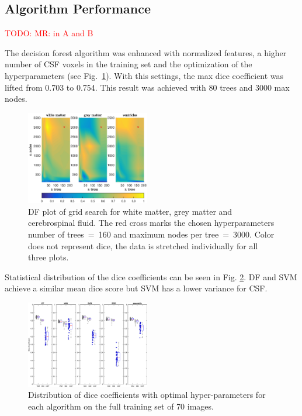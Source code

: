 \documentclass[journal]{IEEEtran}
\newcommand\TODO[1]{\textcolor{red}{TODO: #1}}
\begin{document}
\subsection{Algorithm Performance}
\TODO{MR: in A and B}



The decision forest algorithm was enhanced with normalized features, a higher number of CSF voxels in the training set and the optimization of the hyperparameters (see Fig.~\ref{f.df_white}). With this settings, the max dice coefficient was lifted from 0.703 to 0.754. This result was achieved with 80 trees and 3000 max nodes.

\begin{figure}[h!]\label{f.df_white}
	\centering
	\includegraphics[width=0.48\textwidth]{images/df_grid}
	\caption{DF plot of grid search for white matter, grey matter and cerebrospinal fluid. The red cross marks the chosen hyperparameters number of trees~=~160 and maximum nodes per tree~=~3000. Color does not represent dice, the data is stretched individually for all three plots.}
\end{figure}



Statistical distribution of the dice coefficients can be seen in Fig. \ref{f.boxplot}. DF and SVM achieve a similar mean dice score but SVM has a lower variance for CSF.
\begin{figure}\label{f.boxplot}
	\centering
	\includegraphics[width=0.48\textwidth]{images/boxplot}
	\caption{Distribution of dice coefficients with optimal hyper-parameters for each algorithm on the full training set of 70 images.}
\end{figure}
\end{document}
